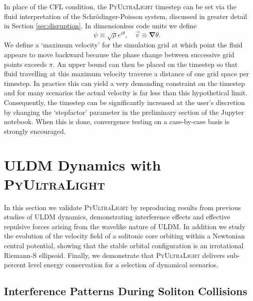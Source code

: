 \documentclass[a4paper,11pt]{article}
\newcommand{\PyUltraLight}{\textsc{PyUltraLight}\xspace}
\begin{document}
In place of the CFL condition, the \PyUltraLight timestep can be set via the fluid interpretation of the Schr{\"o}dinger-Poisson system, discussed in greater detail in Section \ref{sec:disruption}. In dimensionless code units we define 
\begin{equation}\label{eq:madelung}
    \psi\equiv\sqrt{\rho}e^{i\theta}, \quad \vec{v}\equiv\boldsymbol{\nabla}\theta.
\end{equation}
We define a `maximum velocity' for the simulation grid at which point the fluid appears to move backward because the phase change between successive grid points exceeds $\pi$. An upper bound can then be placed on the timestep so that fluid travelling at this maximum  velocity traverse a distance of one grid space per timestep.  In practice this can yield a very demanding constraint on the timestep and for many scenarios the actual velocity is far less than this hypothetical limit. Consequently, the timestep can be  significantly increased at the user's discretion by changing the `step\textunderscore factor' parameter in the preliminary section of the Jupyter notebook. When this is done, convergence testing on a case-by-case basis is strongly encouraged.


\section{ULDM Dynamics with \PyUltraLight}\label{sec:test}

In this section we validate \PyUltraLight by reproducing results from previous studies of ULDM dynamics, demonstrating interference effects and effective repulsive forces arising from the wavelike nature of ULDM. In addition we study the evolution of the velocity field of a solitonic core orbiting within a Newtonian central potential, showing that the stable orbital configuration is an irrotational Riemann-S ellipsoid. Finally, we demonstrate that \PyUltraLight delivers sub-percent level energy conservation for a selection of dynamical scenarios.

\subsection{Interference Patterns During Soliton Collisions}\label{sec:interference}
\end{document}
